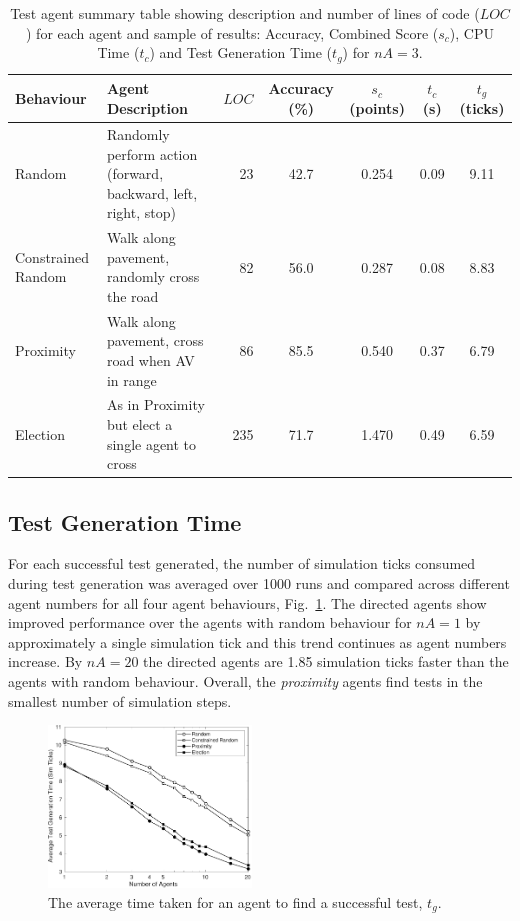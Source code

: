 \documentclass[letterpaper, 10 pt, journal, twoside]{IEEEtran}
\begin{document}
\begin{table}
\centering
\caption{Test agent summary table showing description and number of lines of code ($LOC$) for each agent and sample of results: Accuracy, Combined Score ($s_c$), CPU Time ($t_{c}$) and Test Generation Time ($t_{g}$) for $nA=3$.}
\label{t:ResultsTable}
\begin{tabular}{|l|p{7.1cm}|r||c|c|c|c|}
\hline
\textbf{Behaviour} & \textbf{Agent Description} & $LOC$ & Accuracy (\%) & $s_c$ (points)&  $t_{c}$ (s) & $t_{g}$ (ticks) \\
\hline
Random & Randomly perform action (forward, backward, left, right, stop) &  23& 42.7 & 0.254 & 0.09 & 9.11 \\
Constrained Random & Walk along pavement, randomly cross the road 		&  82& 56.0 & 0.287 & 0.08 & 8.83 \\
Proximity & Walk along pavement, cross road when AV in range 			&  86& 85.5 & 0.540 & 0.37 & 6.79 \\
Election & As in Proximity but elect a single agent to cross 			& 235& 71.7 & 1.470 & 0.49 & 6.59 \\
\hline 
\end{tabular}
\end{table}


\subsection{Test Generation Time}
For each successful test generated, the number of simulation ticks consumed during test generation was averaged over 1000 runs and compared across different agent numbers for all four agent behaviours, Fig.~\ref{f:time}. 
%
The directed agents show improved performance over the agents with random behaviour for $nA=1$ by approximately a single simulation tick and this trend continues as agent numbers increase. By $nA=20$ the directed agents are 1.85 simulation ticks faster than the agents with random behaviour. Overall, the \textit{proximity} agents find tests in the smallest number of simulation steps.

\begin{figure}[!t]
	\centering
\includegraphics[width=0.48\textwidth]{TimeSimTicks.pdf}
	\caption{The average time taken for an agent to find a successful test, $t_{g}$.}
	\label{f:time}
\end{figure}
\end{document}
